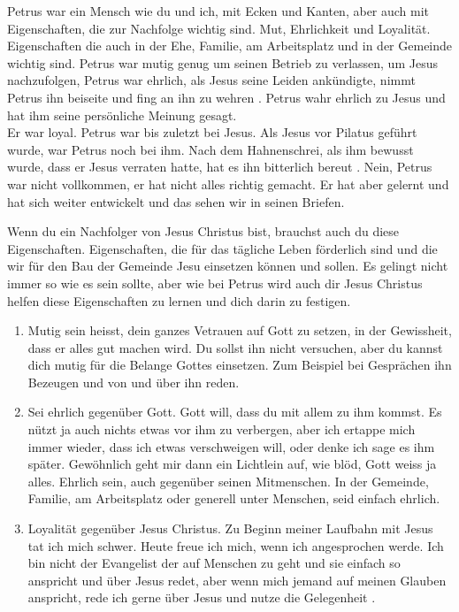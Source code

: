 \documentclass[fontsize=16pt]{mybib}
\begin{document}
Petrus war ein Mensch wie du und ich, mit Ecken und Kanten, aber auch mit Eigenschaften, die zur Nachfolge wichtig sind. Mut, Ehrlichkeit und Loyalität. Eigenschaften die auch in der Ehe, Familie, am Arbeitsplatz und in der Gemeinde wichtig sind. Petrus war mutig genug um seinen Betrieb zu verlassen, um Jesus nachzufolgen, Petrus war ehrlich, \zB{} als Jesus seine Leiden ankündigte, nimmt Petrus ihn beiseite und fing an ihn zu wehren . Petrus wahr ehrlich zu Jesus und hat ihm seine persönliche Meinung gesagt.\\
Er war loyal. Petrus war bis zuletzt bei Jesus. Als Jesus vor Pilatus geführt wurde, war Petrus noch bei ihm. Nach dem Hahnenschrei, als ihm bewusst wurde, dass er Jesus verraten hatte, hat es ihn bitterlich bereut . Nein, Petrus war nicht vollkommen, er hat nicht alles richtig gemacht. Er hat aber gelernt und hat sich weiter entwickelt und das sehen wir in seinen Briefen.

Wenn du ein Nachfolger von Jesus Christus bist, brauchst auch du diese Eigenschaften. Eigenschaften, die für das tägliche Leben förderlich sind und die wir für den Bau der Gemeinde Jesu einsetzen können und sollen. Es gelingt nicht immer so wie es sein sollte, aber wie bei Petrus wird auch dir Jesus Christus helfen diese Eigenschaften zu lernen und dich darin zu festigen.

\begin{enumerate}
    \item [Mutig] Mutig sein heisst, dein ganzes Vetrauen auf Gott zu setzen, in der Gewissheit, dass er alles gut machen wird. Du sollst ihn nicht versuchen, aber du kannst dich mutig für die Belange Gottes einsetzen. Zum Beispiel bei Gesprächen ihn Bezeugen und von und über ihn reden. 
    \item [Ehrlichkeit]Sei ehrlich gegenüber Gott. Gott will, dass du mit allem zu ihm kommst. Es nützt ja auch nichts etwas vor ihm zu verbergen, aber ich \zB ertappe mich immer wieder, dass ich etwas verschweigen will, oder denke ich sage es ihm später. Gewöhnlich geht mir dann ein Lichtlein auf, wie blöd, Gott weiss ja alles. Ehrlich sein, auch gegenüber seinen Mitmenschen. In der Gemeinde, Familie, am Arbeitsplatz oder generell unter Menschen, seid einfach ehrlich.
    \item [Loyalität] Loyalität gegenüber Jesus Christus. Zu Beginn meiner Laufbahn mit Jesus tat ich mich schwer. Heute freue ich mich, wenn ich angesprochen werde. Ich bin nicht der Evangelist der auf Menschen zu geht und sie einfach so anspricht und über Jesus redet, aber wenn mich jemand auf meinen Glauben anspricht, rede ich gerne über Jesus und nutze die Gelegenheit .
\end{enumerate}
\end{document}
